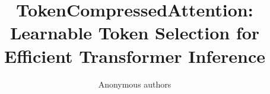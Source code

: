 \title{\textbf{TokenCompressedAttention: Learnable Token Selection for Efficient Transformer Inference}}

\author{Anonymous authors}
